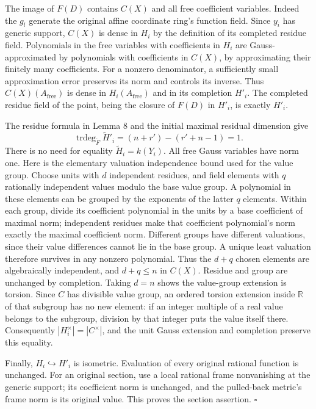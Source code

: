 \documentclass[
  11pt,
]{article}
\begin{document}
The image of \(F(D)\) contains \(C(X)\) and all free coefficient
variables. Indeed the \(g_l\) generate the original affine coordinate
ring's function field. Since \(y_i\) has generic support, \(C(X)\) is
dense in \(H_i\) by the definition of its completed residue field.
Polynomials in the free variables with coefficients in \(H_i\) are
Gauss-approximated by polynomials with coefficients in \(C(X)\), by
approximating their finitely many coefficients. For a nonzero
denominator, a sufficiently small approximation error preserves its norm
and controls its inverse. Thus \(C(X)(A_{\mathrm{free}})\) is dense in
\(H_i(A_{\mathrm{free}})\) and in its completion \(H'_i\). The completed
residue field of the point, being the closure of \(F(D)\) in \(H'_i\),
is exactly \(H'_i\).

The residue formula in Lemma 8 and the initial maximal residual
dimension give \[
 \operatorname{trdeg}_{\widetilde F}\widetilde H'_i
    =(n+r')-(r'+n-1)=1.
\] There is no need for equality \(\widetilde H_i=k(Y_i)\). All free
Gauss variables have norm one. Here is the elementary valuation
independence bound used for the value group. Choose units with \(d\)
independent residues, and field elements with \(q\) rationally
independent values modulo the base value group. A polynomial in these
elements can be grouped by the exponents of the latter \(q\) elements.
Within each group, divide its coefficient polynomial in the units by a
base coefficient of maximal norm; independent residues make that
coefficient polynomial's norm exactly the maximal coefficient norm.
Different groups have different valuations, since their value
differences cannot lie in the base group. A unique least valuation
therefore survives in any nonzero polynomial. Thus the \(d+q\) chosen
elements are algebraically independent, and \(d+q\leq n\) in \(C(X)\).
Residue and group are unchanged by completion. Taking \(d=n\) shows the
value-group extension is torsion. Since \(C\) has divisible value group,
an ordered torsion extension inside \(\mathbb R\) of that subgroup has
no new element: if an integer multiple of a real value belongs to the
subgroup, division by that integer puts the value itself there.
Consequently \(|H_i^\times|=|C^\times|\), and the unit Gauss extension
and completion preserve this equality.

Finally, \(H_i\hookrightarrow H'_i\) is isometric. Evaluation of every
original rational function is unchanged. For an original section, use a
local rational frame nonvanishing at the generic support; its
coefficient norm is unchanged, and the pulled-back metric's frame norm
is its original value. This proves the section assertion. \(\square\)
\end{document}
